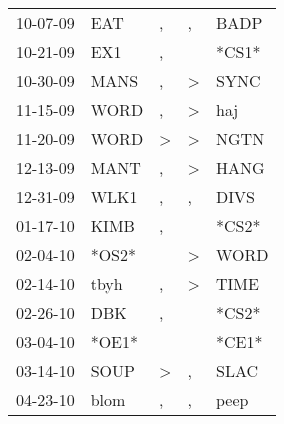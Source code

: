 \begin{supertabular}{p{0.07\textwidth}p{0.06\textwidth}p{0.02\textwidth}p{0.02\textwidth}p{0.06\textwidth}}
          10-07-09\textsuperscript{} &            EAT\textsuperscript{} &                , &                , &           BADP\textsuperscript{} \\
          10-21-09\textsuperscript{} &            EX1\textsuperscript{} &                , &                  &                            *CS1* \\
          10-30-09\textsuperscript{} &           MANS\textsuperscript{} &                , &     \textgreater &           SYNC\textsuperscript{} \\
          11-15-09\textsuperscript{} &           WORD\textsuperscript{} &                , &     \textgreater &            haj\textsuperscript{} \\
          11-20-09\textsuperscript{} &           WORD\textsuperscript{} &     \textgreater &     \textgreater &           NGTN\textsuperscript{} \\
          12-13-09\textsuperscript{} &           MANT\textsuperscript{} &                , &     \textgreater &           HANG\textsuperscript{} \\
          12-31-09\textsuperscript{} &           WLK1\textsuperscript{} &                , &                , &           DIVS\textsuperscript{} \\
          01-17-10\textsuperscript{} &           KIMB\textsuperscript{} &                , &                  &                            *CS2* \\
          02-04-10\textsuperscript{} &                            *OS2* &                  &     \textgreater &           WORD\textsuperscript{} \\
          02-14-10\textsuperscript{} &           tbyh\textsuperscript{} &                , &     \textgreater &           TIME\textsuperscript{} \\
          02-26-10\textsuperscript{} &            DBK\textsuperscript{} &                , &                  &                            *CS2* \\
          03-04-10\textsuperscript{} &                            *OE1* &                  &                  &                            *CE1* \\
          03-14-10\textsuperscript{} &           SOUP\textsuperscript{} &     \textgreater &                , &           SLAC\textsuperscript{} \\
          04-23-10\textsuperscript{} &           blom\textsuperscript{} &                , &                , &           peep\textsuperscript{} \\

\end{supertabular}
